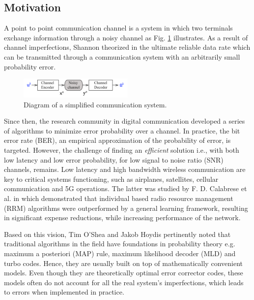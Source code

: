 \documentclass[conference]{IEEEtran}
\begin{document}
\subsection{Motivation}
A point to point communication channel is a system in which  two terminals exchange information through a noisy channel as Fig. \ref{fig:cs} illustrates. As a result of channel imperfections, Shannon theorized in \cite{Shannon:2001:MTC:584091.584093} the ultimate reliable data rate which can be transmitted through a communication system with an arbitrarily small probability error. 

\begin{figure}[!ht]
  \centering
    \includegraphics[width=0.5\textwidth]{simple_sys}
    \caption{Diagram of a simplified communication system.}\label{fig:cs}
\end{figure}

Since then, the research community in digital communication developed a series of algorithms to minimize error probability over a channel. In practice, the bit error rate (BER), an empirical approximation of the probability of error, is targeted. However, the challenge of finding an \textit{efficient} solution  i.e., with both low latency and low error probability, for low signal to noise ratio (SNR) channels, remains. Low latency and high bandwidth wireless communication are key to critical systems functioning, such as airplanes, satellites, cellular communication and 5G operations. The latter was studied by F. D. Calabrese et al. in \cite{DBLP:journals/corr/CalabreseWGPS16} which  demonstrated that individual based radio resource management (RRM) algorithms were outperformed by a general learning framework, resulting in significant expense reductions, while increasing performance of the network.

Based on this vision, Tim O'Shea and Jakob Hoydis \cite{DBLP:journals/corr/OSheaH17} pertinently noted that traditional algorithms in the field have foundations in probability theory e.g. maximum a posteriori (MAP) rule, maximum likelihood decoder (MLD) and turbo codes. Hence, they are usually built on top of mathematically convenient models. Even though they are theoretically optimal error corrector codes, these models often do not account for all the real system's imperfections, which leads to errors when implemented in practice.
\end{document}

